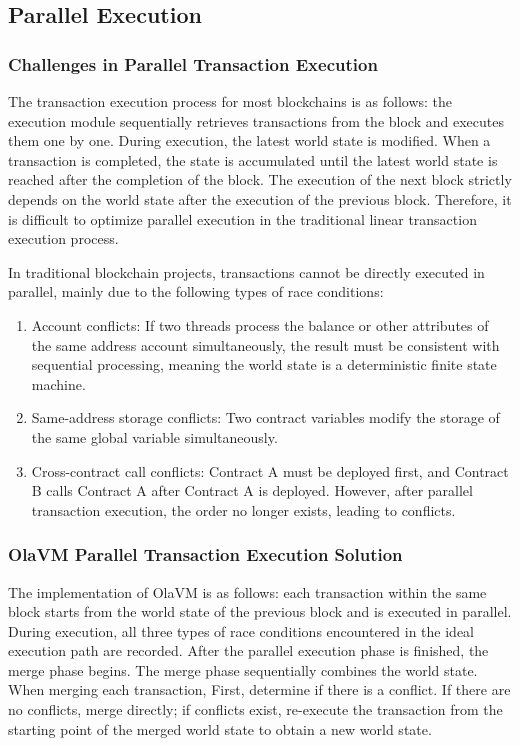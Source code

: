 \subsection{Parallel Execution}\label{section: parallel-execution}

\subsubsection{Challenges in Parallel Transaction Execution}

The transaction execution process for most blockchains is as follows: the execution module sequentially retrieves transactions from the block and executes them one by one. During execution, the latest world state is modified. When a transaction is completed, the state is accumulated until the latest world state is reached after the completion of the block. The execution of the next block strictly depends on the world state after the execution of the previous block. Therefore, it is difficult to optimize parallel execution in the traditional linear transaction execution process.

In traditional blockchain projects, transactions cannot be directly executed in parallel, mainly due to the following types of race conditions:

\begin{enumerate}
    \item Account conflicts: If two threads process the balance or other attributes of the same address account simultaneously, the result must be consistent with sequential processing, meaning the world state is a deterministic finite state machine.
    \item Same-address storage conflicts: Two contract variables modify the storage of the same global variable simultaneously.
    \item Cross-contract call conflicts: Contract A must be deployed first, and Contract B calls Contract A after Contract A is deployed. However, after parallel transaction execution, the order no longer exists, leading to conflicts.
\end{enumerate}

\subsubsection{OlaVM Parallel Transaction Execution Solution}

The implementation of OlaVM is as follows: each transaction within the same block starts from the world state of the previous block and is executed in parallel. During execution, all three types of race conditions encountered in the ideal execution path are recorded. After the parallel execution phase is finished, the merge phase begins. The merge phase sequentially combines the world state. When merging each transaction, First, determine if there is a conflict.  If there are no conflicts, merge directly; if conflicts exist, re-execute the transaction from the starting point of the merged world state to obtain a new world state.

